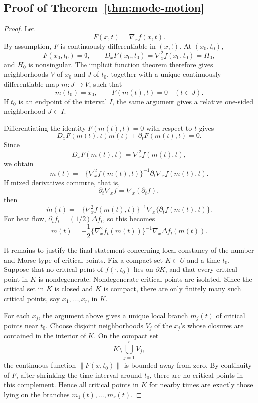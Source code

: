 \documentclass[preprint]{imsart}
\theoremstyle{plain}
\theoremstyle{definition}
\begin{document}
\begin{appendix}
\section{Proof of Theorem~\ref{thm:mode-motion}}\label{app:proof1}
\begin{proof}
Let
\[
  F(x,t)=\nabla_x f(x,t).
\]
By assumption, \(F\) is continuously differentiable in \((x,t)\). At
\((x_0,t_0)\),
\[
  F(x_0,t_0)=0,
  \qquad
  D_xF(x_0,t_0)=\nabla_x^2 f(x_0,t_0)=H_0,
\]
and \(H_0\) is nonsingular. The implicit function theorem therefore gives
neighborhoods \(V\) of \(x_0\) and \(J\) of \(t_0\), together with a unique
continuously differentiable map \(m:J\to V\), such that
\[
  m(t_0)=x_0,
  \qquad
  F(m(t),t)=0
  \quad (t\in J).
\]
If \(t_0\) is an endpoint of the interval \(I\), the same argument gives a
relative one-sided neighborhood \(J\subset I\).

Differentiating the identity \(F(m(t),t)=0\) with respect to \(t\) gives
\[
  D_xF(m(t),t)\dot m(t)+\partial_tF(m(t),t)=0.
\]
Since
\[
  D_xF(m(t),t)=\nabla_x^2 f(m(t),t),
\]
we obtain
\[
  \dot m(t)
  =
  -\{\nabla_x^2 f(m(t),t)\}^{-1}\partial_t\nabla_x f(m(t),t).
\]
If mixed derivatives commute, that is,
\[
  \partial_t\nabla_x f=\nabla_x(\partial_t f),
\]
then
\[
  \dot m(t)
  =
  -\{\nabla_x^2 f(m(t),t)\}^{-1}
   \nabla_x\{\partial_t f(m(t),t)\}.
\]
For heat flow, \(\partial_t f_t=(1/2)\Delta f_t\), so this becomes
\[
  \dot m(t)
  =
  -\frac12\{\nabla_x^2 f_t(m(t))\}^{-1}
  \nabla_x\Delta f_t(m(t)).
\]

It remains to justify the final statement concerning local constancy of
the number and Morse type of critical points. Fix a compact set
\(K\subset U\) and a time \(t_0\). Suppose that no critical point of
\(f(\cdot,t_0)\) lies on \(\partial K\), and that every critical point in
\(K\) is nondegenerate. Nondegenerate critical points are isolated. Since
the critical set in \(K\) is closed and \(K\) is compact, there are only
finitely many such critical points, say \(x_1,\ldots,x_r\), in \(K\).

For each \(x_j\), the argument above gives a unique local branch
\(m_j(t)\) of critical points near \(t_0\). Choose disjoint neighborhoods
\(V_j\) of the \(x_j\)'s whose closures are contained in the interior of
\(K\). On the compact set
\[
  K\setminus \bigcup_{j=1}^r V_j,
\]
the continuous function \(\|F(x,t_0)\|\) is bounded away from zero.
By continuity of \(F\), after shrinking the time interval around \(t_0\),
there are no critical points in this complement. Hence all critical
points in \(K\) for nearby times are exactly those lying on the branches
\(m_1(t),\ldots,m_r(t)\).


\end{proof}
\end{appendix}
\end{document}
